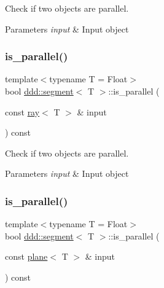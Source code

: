Check if two objects are parallel. 


\begin{DoxyParams}{Parameters}
{\em input} & Input object \\
\hline
\end{DoxyParams}
\mbox{\label{classddd_1_1segment_a52f0c892e033d93df537635ebcfd0c60}} 
\subsubsection{\texorpdfstring{is\+\_\+parallel()}{is\_parallel()}\hspace{0.1cm}{\footnotesize\ttfamily [3/5]}}
{\footnotesize\ttfamily template$<$typename T = Float$>$ \\
bool \hyperlink{classddd_1_1segment}{ddd\+::segment}$<$ T $>$\+::is\+\_\+parallel (\begin{DoxyParamCaption}\item[{const \hyperlink{classddd_1_1ray}{ray}$<$ T $>$ \&}]{input }\end{DoxyParamCaption}) const\hspace{0.3cm}{\ttfamily [inline]}}



Check if two objects are parallel. 


\begin{DoxyParams}{Parameters}
{\em input} & Input object \\
\hline
\end{DoxyParams}
\mbox{\label{classddd_1_1segment_a00bb060cf8faa57badf57893e1cdfad2}} 
\subsubsection{\texorpdfstring{is\+\_\+parallel()}{is\_parallel()}\hspace{0.1cm}{\footnotesize\ttfamily [4/5]}}
{\footnotesize\ttfamily template$<$typename T = Float$>$ \\
bool \hyperlink{classddd_1_1segment}{ddd\+::segment}$<$ T $>$\+::is\+\_\+parallel (\begin{DoxyParamCaption}\item[{const \hyperlink{classddd_1_1plane}{plane}$<$ T $>$ \&}]{input }\end{DoxyParamCaption}) const\hspace{0.3cm}{\ttfamily [inline]}}



